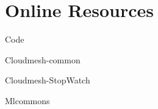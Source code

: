 \documentclass[sigplan,screen,review]{acmart}
\begin{document}




\appendix

\section{Online Resources}

\begin{description}

\item{Code}
\item{Cloudmesh-common}
\item{Cloudmesh-StopWatch}
\item{Mlcommons}

\end{description}
\end{document}
